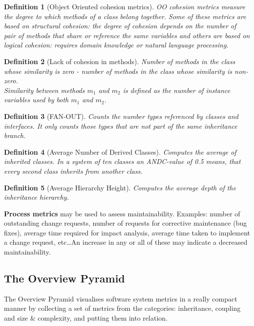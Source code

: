 \documentclass[a4paper,11pt]{report}
\newtheorem{definition}{Definition}
\begin{document}
\begin{definition}[Object Oriented cohesion metrics]
OO cohesion metrics measure the degree to which methods of a class belong
together. Some of these metrics are based on structural cohesion: the degree of
cohesion depends on the number of pair of methods that share or reference the
same variables and others are based on logical cohesion: requires domain
knowledge or natural language processing.
\end{definition}

\begin{definition}[Lack of cohesion in methods]
Number of methods in the class whose similarity is zero - number of methods in
the class whose similarity is non-zero.\\

Similarity between methods $m_1$ and $m_2$ is defined as the number of
instance variables used by both $m_1$ and $m_2$.
\end{definition}

\begin{definition}[FAN-OUT]
Counts the number types referenced by classes and interfaces. It only counts
those types that are not part of the same inheritance branch.
\end{definition}

\begin{definition}[Average Number of Derived Classes]
Computes the average of inherited classes. In a system of ten classes an
ANDC-value of 0.5 means, that every second class inherits from another class.
\end{definition}

\begin{definition}[Average Hierarchy Height]
Computes the average depth of the inheritance hierarchy.
\end{definition}

\noindent
\textbf{Process metrics} may be used to assess maintainability. Examples: number
of outstanding change requests, number of requests for corrective maintenance
(bug fixes), average time required for impact analysis, average time taken to
implement a change request, etc\dots An increase in any or all of these may
indicate a decreased maintainability.

\subsection{The Overview Pyramid}
The Overview Pyramid visualises software system metrics in a really compact
manner by collecting a set of metrics from the categories: inheritance, coupling
and size \& complexity, and putting them into relation.\\
\end{document}
